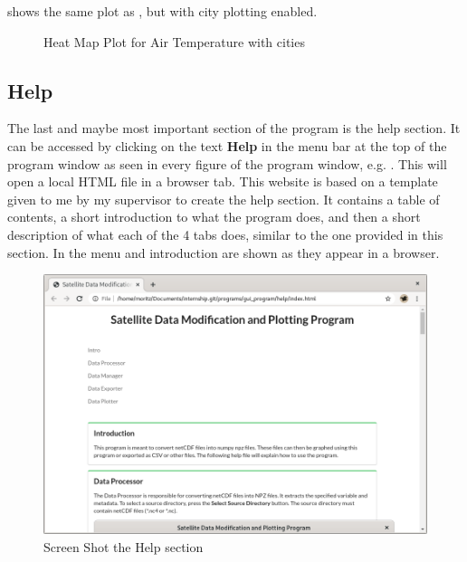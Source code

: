 \documentclass[../00_main.tex]{subfiles}
\begin{document}
 shows the same plot as , but with city
plotting enabled.
\begin{figure}[h]
    \center
    \caption{Heat Map Plot for Air Temperature with cities}
    \label{plt:dpl03}
\end{figure}

\subsection{Help}

The last and maybe most important section of the program is the help section.
It can be accessed by clicking on the text \textbf{Help} in the menu bar at the
top of the program window as seen in every figure of the program window, e.g.
. This will open a local HTML file in a browser tab. This website
is based on a template given to me by my supervisor to create the help
section. It contains a table of contents, a short introduction to what the
program does, and then a short description of what each of the 4 tabs does,
similar to the one provided in this section. In  the menu and
introduction are shown as they appear in a browser.
\begin{figure}[H]
    \center
    \includegraphics[width=\textwidth]{../graphics/help}
    \caption{Screen Shot the Help section}
    \label{help}
\end{figure}
\end{document}
